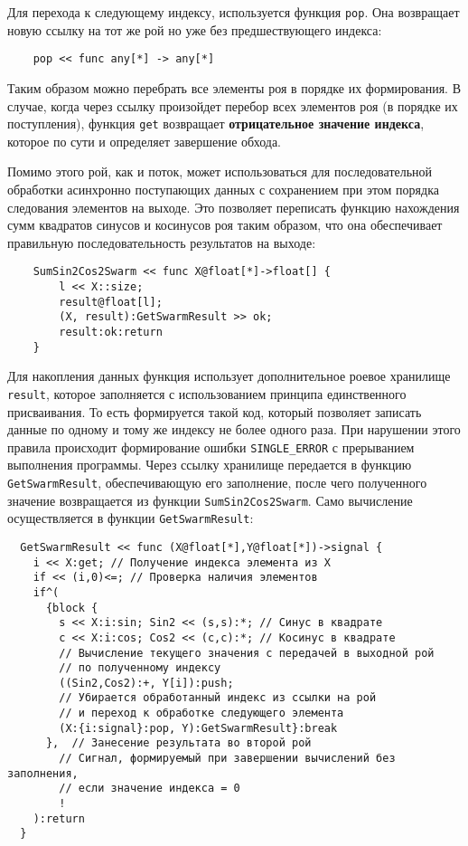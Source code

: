 Для перехода к следующему индексу, используется функция \texttt{pop}. Она возвращает новую ссылку на тот же рой но уже без предшествующего индекса:
\begin{verbatim}
    pop << func any[*] -> any[*]
\end{verbatim}
Таким образом можно перебрать все элементы роя в порядке их формирования. В случае, когда через ссылку произойдет перебор всех элементов роя (в порядке их поступления), функция \texttt{get} возвращает \textbf{отрицательное значение индекса}, которое по сути и определяет завершение обхода.

Помимо этого рой, как и поток, может использоваться для последовательной обработки асинхронно поступающих данных с сохранением при этом порядка следования элементов на выходе. Это позволяет переписать функцию нахождения сумм квадратов синусов и косинусов роя таким образом, что она обеспечивает правильную последовательность результатов на выходе:
\begin{verbatim}
    SumSin2Cos2Swarm << func X@float[*]->float[] {
        l << X::size;
        result@float[l];
        (X, result):GetSwarmResult >> ok;
        result:ok:return
    }
\end{verbatim}
Для накопления данных функция использует дополнительное роевое хранилище \texttt{result}, которое заполняется с использованием принципа единственного присваивания. То есть формируется такой код, который позволяет записать данные по одному и тому же индексу не более одного раза. При нарушении этого правила происходит формирование ошибки \verb|SINGLE_ERROR| с прерыванием выполнения программы. Через ссылку хранилище передается в функцию \texttt{GetSwarmResult}, обеспечивающую его заполнение, после чего полученного значение возвращается из функции \texttt{SumSin2Cos2Swarm}. Само вычисление осуществляется в функции \texttt{GetSwarmResult}:
\begin{verbatim}
  GetSwarmResult << func (X@float[*],Y@float[*])->signal {
    i << X:get; // Получение индекса элемента из X
    if << (i,0)<=; // Проверка наличия элементов
    if^(
      {block {
        s << X:i:sin; Sin2 << (s,s):*; // Синус в квадрате
        c << X:i:cos; Cos2 << (c,c):*; // Косинус в квадрате
        // Вычисление текущего значения с передачей в выходной рой
        // по полученному индексу
        ((Sin2,Cos2):+, Y[i]):push;
        // Убирается обработанный индекс из ссылки на рой
        // и переход к обработке следующего элемента
        (X:{i:signal}:pop, Y):GetSwarmResult}:break
      },  // Занесение результата во второй рой
        // Сигнал, формируемый при завершении вычислений без заполнения,
        // если значение индекса = 0
        !
    ):return
  }
\end{verbatim}
